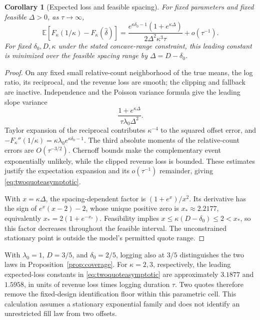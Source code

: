 \documentclass[11pt]{article}
\theoremstyle{plain}
\newtheorem{corollary}[theorem]{Corollary}
\theoremstyle{definition}
\theoremstyle{remark}
\newcommand{\E}{\mathbb E}
\begin{document}
\begin{corollary}[Expected loss and feasible spacing]\label{cor:quotedesign}
For fixed parameters and fixed feasible \(\Delta>0\), as
\(\tau\to\infty\),
\begin{equation}\label{eq:twoquoteasymptotic}
\E[F_\kappa(1/\kappa)-F_\kappa(\widehat\delta)]
=\frac{e^{\kappa\delta_0-1}(1+e^{\kappa\Delta})}
                {2\Delta^2\kappa^3\tau}+o(\tau^{-1}).
\end{equation}
For fixed \(\delta_0,D,\kappa\) under the stated concave-range
constraint, this leading constant is minimized over the feasible
spacing range by \(\Delta=D-\delta_0\).
\end{corollary}
\begin{proof}
On any fixed small relative-count neighborhood of the true means,
the log ratio, its reciprocal, and the revenue loss are smooth;
the clipping and fallback are inactive. Independence and the Poisson
variance formula give the leading slope variance
\[
\frac{1+e^{\kappa\Delta}}{\tau\lambda_0\Delta^2}.
\]
Taylor expansion of the reciprocal contributes \(\kappa^{-4}\)
to the squared offset error, and
\(-F_\kappa''(1/\kappa)=\kappa\lambda_0e^{\kappa\delta_0-1}\).
The third absolute moments of the relative-count errors are
\(O(\tau^{-3/2})\). Chernoff bounds make the complementary event
exponentially unlikely, while the clipped revenue loss is bounded.
These estimates justify the expectation expansion and its
\(o(\tau^{-1})\) remainder, giving \eqref{eq:twoquoteasymptotic}.

With \(x=\kappa\Delta\), the spacing-dependent factor is
\((1+e^x)/x^2\). Its derivative has the sign of
\(e^x(x-2)-2\), whose unique positive zero is
\(x_\ast\approx2.2177\), equivalently
\(x_\ast=2(1+e^{-x_\ast})\). Feasibility implies
\(x\le\kappa(D-\delta_0)\le2<x_\ast\), so this factor decreases
throughout the feasible interval. The unconstrained stationary point
is outside the model's permitted quote range.
\end{proof}

With \(\lambda_0=1\), \(D=3/5\), and \(\delta_0=2/5\), logging
also at \(3/5\) distinguishes the two laws in
Proposition~\ref{prop:coverage}. For \(\kappa=2,3\), respectively,
the leading expected-loss constants in \eqref{eq:twoquoteasymptotic}
are approximately \(3.1877\) and \(1.5958\), in units of revenue
loss times logging duration \(\tau\). Two quotes therefore remove
the fixed-design identification floor within this parametric cell.
This calculation assumes a stationary exponential family and does
not identify an unrestricted fill law from two offsets.
\end{document}
